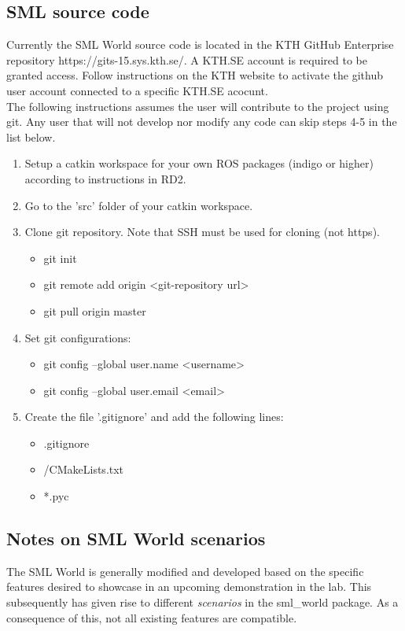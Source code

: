 \documentclass[11pt,a4paper]{book}
\begin{document}
\subsection{SML source code}
\label{sec:sourcecode}
Currently the SML World source code is located in the KTH GitHub Enterprise repository https://gits-15.sys.kth.se/.
A KTH.SE account is required to be granted access. Follow instructions on the KTH website to activate the github user account connected to a specific KTH.SE acocunt. \\

\noindent The following instructions assumes the user will contribute to the project using git. Any user that will not develop nor modify any code can skip steps 4-5 in the list below.
\begin{enumerate}
\item Setup a catkin workspace for your own ROS packages (indigo or higher) according to instructions in RD2.
\item Go to the 'src' folder of your catkin workspace. 
\item Clone git repository. Note that SSH must be used for cloning (not https).
      \begin{itemize}
        \item git init
        \item git remote add origin <git-repository url>
        \item git pull origin master
      \end{itemize}
\item Set git configurations:
      \begin{itemize}
        \item git config --global user.name <username>
        \item git config --global user.email <email>
      \end{itemize}
\item Create the file '.gitignore' and add the following lines:
      \begin{itemize}
        \item .gitignore
        \item /CMakeLists.txt
        \item *.pyc
      \end{itemize}
\end{enumerate}


\subsection{Notes on SML World scenarios}
The SML World is generally modified and developed based on the specific features desired to showcase in an upcoming demonstration in the lab. This subsequently has given rise to different \textit{scenarios} in the sml\_world package. As a consequence of this, not all existing features are compatible. 
\end{document}
